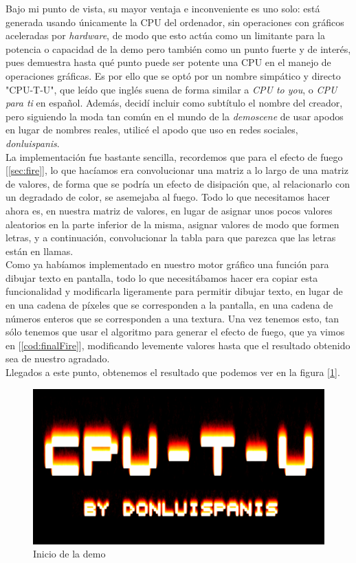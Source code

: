 Bajo mi punto de vista, su mayor ventaja e inconveniente es uno solo: está generada usando únicamente la CPU del ordenador, sin operaciones con gráficos aceleradas por \emph{hardware}, de modo que esto actúa como un limitante para la potencia o capacidad de la demo pero también como un punto fuerte y de interés, pues demuestra hasta qué punto puede ser potente una CPU en el manejo de operaciones gráficas. Es por ello que se optó por un nombre simpático y directo "CPU-T-U", que leído que inglés suena de forma similar a \emph{CPU to you}, o \emph{CPU para ti} en español. Además, decidí incluir como subtítulo el nombre del creador, pero siguiendo la moda tan común en el mundo de la \emph{demoscene} de usar apodos en lugar de nombres reales, utilicé el apodo que uso en redes sociales, \emph{donluispanis}.\\

La implementación fue bastante sencilla, recordemos que para el efecto de fuego [\ref{sec:fire}], lo que hacíamos era convolucionar una matriz a lo largo de una matriz de valores, de forma que se podría un efecto de disipación que, al relacionarlo con un degradado de color, se asemejaba al fuego. Todo lo que necesitamos hacer ahora es, en nuestra matriz de valores, en lugar de asignar unos pocos valores aleatorios en la parte inferior de la misma, asignar valores de modo que formen letras, y a continuación, convolucionar la tabla para que parezca que las letras están en llamas.\\

Como ya habíamos implementado en nuestro motor gráfico una función para dibujar texto en pantalla, todo lo que necesitábamos hacer era copiar esta funcionalidad y modificarla ligeramente para permitir dibujar texto, en lugar de en una cadena de píxeles que se corresponden a la pantalla, en una cadena de números enteros que se corresponden a una textura. Una vez tenemos esto, tan sólo tenemos que usar el algoritmo para generar el efecto de fuego, que ya vimos en [\ref{cod:finalFire}], modificando levemente valores hasta que el resultado obtenido sea de nuestro agradado.\\

Llegados a este punto, obtenemos el resultado que podemos ver en la figura [\ref{fig:intro}].\\

\begin{figure}[h]
	\centering
	\includegraphics[width=12cm]{archivos/intro}
	\caption{Inicio de la demo}
	\label{fig:intro}
\end{figure}

